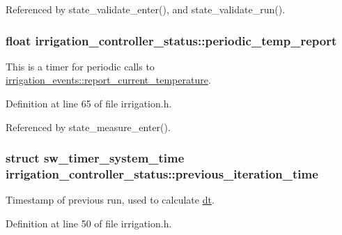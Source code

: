 Referenced by state\+\_\+validate\+\_\+enter(), and state\+\_\+validate\+\_\+run().

\hypertarget{structirrigation__controller__status_aab428bb9e677098d336aefd32b5e6232}{}
\subsubsection[{periodic\+\_\+temp\+\_\+report}]{\setlength{\rightskip}{0pt plus 5cm}float irrigation\+\_\+controller\+\_\+status\+::periodic\+\_\+temp\+\_\+report}\label{structirrigation__controller__status_aab428bb9e677098d336aefd32b5e6232}


This is a timer for periodic calls to \hyperlink{structirrigation__events_a47b81edd52377b4c4e1ed512b830e237}{irrigation\+\_\+events\+::report\+\_\+current\+\_\+temperature}. 



Definition at line 65 of file irrigation.\+h.



Referenced by state\+\_\+measure\+\_\+enter().

\hypertarget{structirrigation__controller__status_ab5a5ed310a96d8fd4db605bad57bf83a}{}
\subsubsection[{previous\+\_\+iteration\+\_\+time}]{\setlength{\rightskip}{0pt plus 5cm}struct {\bf sw\+\_\+timer\+\_\+system\+\_\+time} irrigation\+\_\+controller\+\_\+status\+::previous\+\_\+iteration\+\_\+time}\label{structirrigation__controller__status_ab5a5ed310a96d8fd4db605bad57bf83a}


Timestamp of previous run, used to calculate \hyperlink{structirrigation__controller__status_a0a4447a8aa2200bacf97bd7e844493c1}{dt}. 



Definition at line 50 of file irrigation.\+h.

